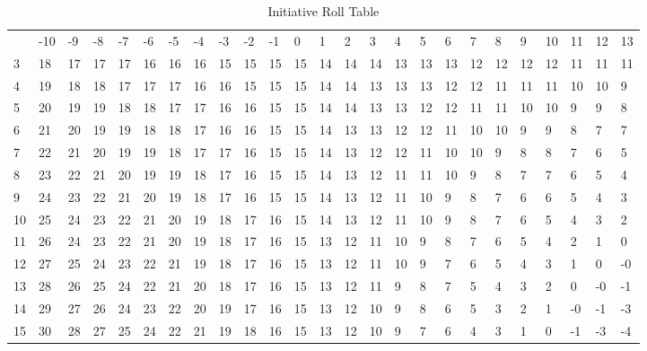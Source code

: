\begin{table}[htb]
\centering
\caption{Initiative Roll Table}
	\begin{tabular}{||l|l|l|l|l|l|l|l|l|l|l|l|l|l|l|l|l|l|l|l|l|l|l|l|l||} \hline
		 & -10&	 -9	& -8 &  -7	& -6 &-5  &-4 & -3	&-2	 &-1   &0  &1   &  2 & 3  & 4 &  5 &  6 &  7  &  8 &  9 & 10 & 11 & 12 & 13 \\
       3 &  18&   17&  17&   17 & 16 & 16 & 16&  15 & 15 & 15  &15 & 14 & 14 & 14 & 13&  13&  13&  12 & 12 & 12 & 12 & 11 & 11 & 11 \\
       4 &  19&   18&  18&   17 & 17 & 17 & 16&  16 & 15 & 15  &15 & 14 & 14 & 13 & 13&  13&  12&  12 & 11 & 11 & 11 & 10 & 10 &  9 \\
       5 &  20&   19&  19&   18 & 18 & 17 & 17&  16 & 16 & 15  &15 & 14 & 14 & 13 & 13&  12&  12&  11 & 11 & 10 & 10 &  9 &  9 &  8 \\
       6 &  21&   20&  19&   19 & 18 & 18 & 17&  16 & 16 & 15  &15 & 14 & 13 & 13 & 12&  12&  11&  10 & 10 &  9 &  9 &  8 &  7 &  7 \\
       7 &  22&   21&  20&   19 & 19 & 18 & 17&  17 & 16 & 15  &15 & 14 & 13 & 12 & 12&  11&  10&  10 &  9 &  8 &  8 &  7 &  6 &  5 \\
       8 &  23&   22&  21&   20 & 19 & 19 & 18&  17 & 16 & 15  &15 & 14 & 13 & 12 & 11&  11&  10&   9 &  8 &  7 &  7 &  6 &  5 &  4 \\
       9 &  24&   23&  22&   21 & 20 & 19 & 18&  17 & 16 & 15  &15 & 14 & 13 & 12 & 11&  10&   9&   8 &  7 &  6 &  6 &  5 &  4 &  3 \\
      10 &  25&   24&  23&   22 & 21 & 20 & 19&  18 & 17 & 16  &15 & 14 & 13 & 12 & 11&  10&   9&   8 &  7 &  6 &  5 &  4 &  3 &  2 \\
      11 &  26&   24&  23&   22 & 21 & 20 & 19&  18 & 17 & 16  &15 & 13 & 12 & 11 & 10&   9&   8&   7 &  6 &  5 &  4 &  2 &  1 &  0 \\
      12 &  27&   25&  24&   23 & 22 & 21 & 19&  18 & 17 & 16  &15 & 13 & 12 & 11 & 10&   9&   7&   6 &  5 &  4 &  3 &  1 &  0 & -0 \\
      13 &  28&   26&  25&   24 & 22 & 21 & 20&  18 & 17 & 16  &15 & 13 & 12 & 11 &  9&   8&   7&   5 &  4 &  3 &  2 &  0 & -0 & -1 \\
      14 &  29&   27&  26&   24 & 23 & 22 & 20&  19 & 17 & 16  &15 & 13 & 12 & 10 &  9&   8&   6&   5 &  3 &  2 &  1 & -0 & -1 & -3 \\
      15 &  30&   28&  27&   25 & 24 & 22 & 21&  19 & 18 & 16  &15 & 13 & 12 & 10 &  9&   7&   6&   4 &  3 &  1 &  0 & -1 & -3 & -4 \\

\end{tabular}
\end{table}
